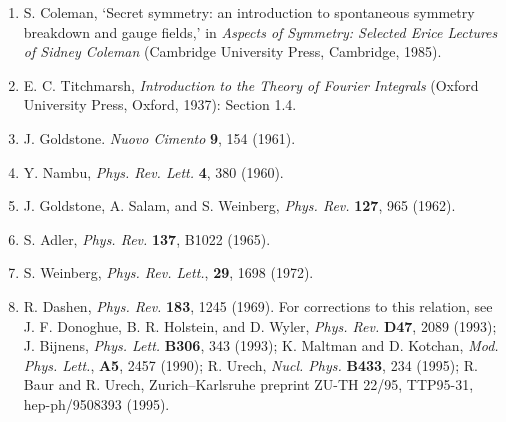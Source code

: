


\begin{enumerate}
\item {}\label{ch19-ref-1}
S. Coleman, `Secret symmetry: an introduction to spontaneous symmetry breakdown and gauge fields,' in \emph{Aspects of Symmetry: Selected Erice Lectures of Sidney Coleman} (Cambridge University Press, Cambridge, 1985).

\item {}\label{ch19-ref-2}
E. C. Titchmarsh, \emph{Introduction to the Theory of Fourier Integrals} (Oxford University Press, Oxford, 1937): Section 1.4.

\item {}\label{ch19-ref-3}
J. Goldstone. \emph{Nuovo Cimento} \textbf{9}, 154 (1961).

\item {}\label{ch19-ref-4}
Y. Nambu, \emph{Phys. Rev. Lett.} \textbf{4}, 380 (1960).

\item {}\label{ch19-ref-5}
J. Goldstone, A. Salam, and S. Weinberg, \emph{Phys. Rev.} \textbf{127}, 965 (1962).

\item {}\label{ch19-ref-6}
S. Adler, \emph{Phys. Rev.} \textbf{137}, B1022 (1965).

\item {}\label{ch19-ref-7}
S. Weinberg, \emph{Phys. Rev. Lett.}, \textbf{29}, 1698 (1972).

\item {}\label{ch19-ref-8}
R. Dashen, \emph{Phys. Rev.} \textbf{183}, 1245 (1969). For corrections to this relation, see J. F. Donoghue, B. R. Holstein, and D. Wyler, \emph{Phys. Rev.} \textbf{D47}, 2089 (1993); J. Bijnens, \emph{Phys. Lett.} \textbf{B306}, 343 (1993); K. Maltman and D. Kotchan, \emph{Mod. Phys. Lett.}, \textbf{A5}, 2457 (1990); R. Urech, \emph{Nucl. Phys.} \textbf{B433}, 234 (1995); R. Baur and R. Urech, Zurich--Karlsruhe preprint ZU-TH 22/95, TTP95-31, hep-ph/9508393 (1995).


\end{enumerate}
